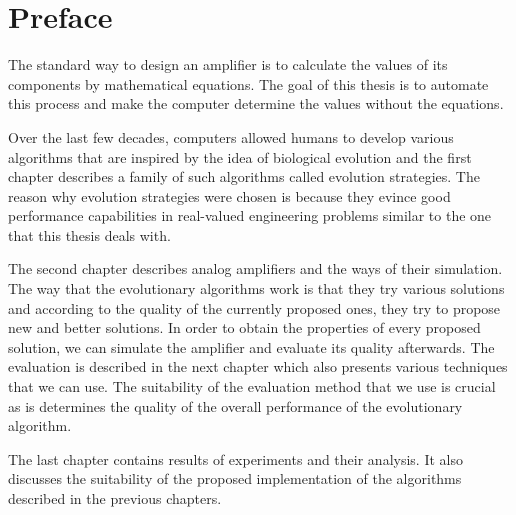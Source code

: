 \chapter{Preface}
The standard way to design an amplifier is to calculate the values of its components by mathematical equations. The goal of this thesis is to automate this process and make the computer determine the values without the equations.

Over the last few decades, computers allowed humans to develop various algorithms that are inspired by the idea of biological evolution and the first chapter describes a family of such algorithms called evolution strategies. The reason why evolution strategies were chosen is because they evince good performance capabilities in real-valued engineering problems similar to the one that this thesis deals with.

The second chapter describes analog amplifiers and the ways of their simulation. The way that the evolutionary algorithms work is that they try various solutions and according to the quality of the currently proposed ones, they try to propose new and better solutions. In order to obtain the properties of every proposed solution, we can simulate the amplifier and evaluate its quality afterwards. The evaluation is described in the next chapter which also presents various techniques that we can use. The suitability of the evaluation method that we use is crucial as is determines the quality of the overall performance of the evolutionary algorithm.

The last chapter contains results of experiments and their analysis. It also discusses the suitability of the proposed implementation of the algorithms described in the previous chapters.